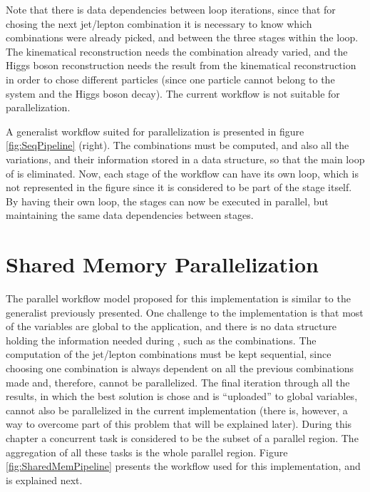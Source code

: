 Note that there is data dependencies between loop iterations, since that for chosing the next jet/lepton combination it is necessary to know which combinations were already picked, and between the three stages within the loop. The kinematical reconstruction needs the combination already varied, and the Higgs boson reconstruction needs the result from the kinematical reconstruction in order to chose different particles (since one particle cannot belong to the \ttbar system and the Higgs boson decay). The current workflow is not suitable for parallelization.

A generalist workflow suited for parallelization is presented in figure \ref{fig:SeqPipeline} (right). The combinations must be computed, and also all the variations, and their information stored in a data structure, so that the main loop of \ttDilepKinFit is eliminated. Now, each stage of the workflow can have its own loop, which is not represented in the figure since it is considered to be part of the stage itself. By having their own loop, the stages can now be executed in parallel, but maintaining the same data dependencies between stages.

\section{Shared Memory Parallelization}
\label{Parallelization:SharedMem}

The parallel workflow model proposed for this implementation is similar to the generalist previously presented. One challenge to the implementation is that most of the variables are global to the application, and there is no data structure holding the information needed during \ttDilepKinFit, such as the combinations. The computation of the jet/lepton combinations must be kept sequential, since choosing one combination is always dependent on all the previous combinations made and, therefore, cannot be parallelized. The final iteration through all the results, in which the best solution is chose and is ``uploaded'' to global variables, cannot also be parallelized in the current implementation (there is, however, a way to overcome part of this problem that will be explained later). During this chapter a concurrent task is considered to be the subset of a parallel region. The aggregation of all these tasks is the whole parallel region. Figure \ref{fig:SharedMemPipeline} presents the workflow used for this implementation, and is explained next.

